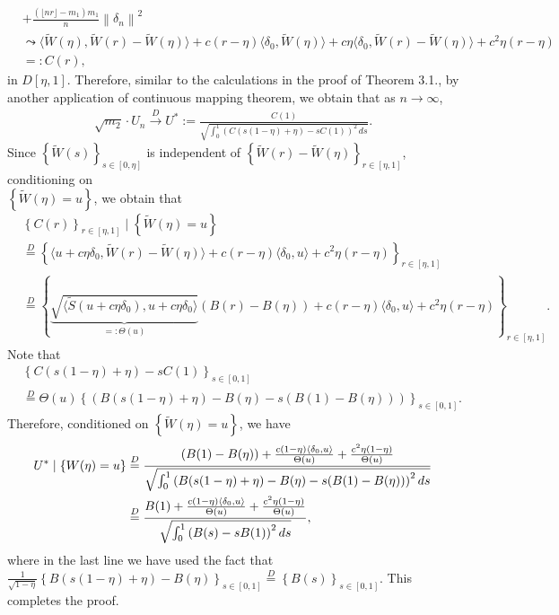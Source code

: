 \documentclass[11pt]{article}
\theoremstyle{plain}
\theoremstyle{definition}
\theoremstyle{remark}
\begin{document}
\begin{appendix}
\begin{enumerate}
\begin{align*}
        &+\frac{(\lfloor nr \rfloor-m_1) m_1}{n}\left\|\delta_n\right\|^2\\
        &\leadsto \langle \tilde{W}(\eta), \tilde{W}(r)-\tilde{W}(\eta)\rangle+ c(r-\eta)\langle \delta_0 , \tilde{W}(\eta)\rangle + c \eta \langle \delta_0, \tilde{W}(r)-\tilde{W}(\eta)\rangle +c^2 \eta (r-\eta)\\
        &=:C(r),        
    \end{align*}
    in $D[\eta,1]$. Therefore, similar to the calculations in the proof of Theorem 3.1., by another application of continuous mapping theorem, we obtain that as $n \to \infty$,
    \begin{align*}
        \sqrt{m_2} \cdot U_n\overset{D}{\to} U^*:=\frac{C(1)}{\sqrt{\int_{0}^{1}\left(C(s(1-\eta)+\eta)-sC(1)\right)^2\,ds}}.
    \end{align*}
    Since $\left\{\tilde{W}(s)\right\}_{s \in [0,\eta]}$ is independent of $\left\{\tilde{W}(r)-\tilde{W}(\eta)\right\}_{r \in [\eta, 1]}$, conditioning on\\ $\left\{\tilde{W}(\eta)=u\right\}$, we obtain that
    \begin{align*}
        &\left\{C(r)\right\}_{r \in [\eta,1]}\mid \left\{\tilde{W}(\eta)=u\right\}\\
        &\overset{D}{=} \left\{\langle u+c \eta \delta_0, \tilde{W}(r)-\tilde{W}(\eta)\rangle +c (r-\eta) \langle \delta_0, u \rangle + c^2 \eta (r-\eta)\right\}_{r \in [\eta,1]}\\
        &\overset{D}{=}\left\{\underbrace{\sqrt{\langle \tilde{S}(u+c \eta \delta_0), u+c \eta \delta_0\rangle}}_{=:\Theta(u)}\left(B(r)-B(\eta)\right)+c (r-\eta) \langle \delta_0, u \rangle + c^2 \eta (r-\eta)\right\}_{r \in [\eta,1]} .
    \end{align*}%
     Note that
    \begin{align*}
        &\left\{C(s(1-\eta)+\eta)-sC(1)\right\}_{s \in [0,1]}\\
        &\overset{D}{=}\Theta(u)\left\{\left(B(s(1-\eta)+\eta)-B(\eta)-s(B(1)-B(\eta))\right)\right\}_{s \in [0,1]}.
    \end{align*}
    Therefore, conditioned on $\left\{\tilde{W}(\eta)=u\right\}$, we have
    \begin{align*}
        U^*\mid \left\{W(\eta)=u\right\}&\overset{D}{=} \frac{(B(1)-B(\eta))+\frac{c (1-\eta) \langle \delta_0, u \rangle}{\Theta(u)}+\frac{c^2 \eta (1-\eta)}{\Theta(u)}}{\sqrt{\int_{0}^{1}\left(B(s(1-\eta)+\eta)-B(\eta)-s(B(1)-B(\eta))\right)^2 ds}}\allowdisplaybreaks\\
        &\overset{D}{=}\frac{B(1)+\frac{c (1-\eta) \langle \delta_0, u \rangle}{\Theta(u)}+\frac{c^2 \eta (1-\eta)}{\Theta(u)}}{\sqrt{\int_{0}^{1}\left(B(s)-sB(1)\right)^2 ds}},
    \end{align*}
    where in the last line we have used the fact that\\ $\frac{1}{\sqrt{1-\eta}}\left\{B(s(1-\eta)+\eta)-B(\eta)\right\}_{s \in [0,1]}\overset{D}{=}\left\{B(s)\right\}_{s \in [0,1]}.$ This completes the proof.
    \end{enumerate}

\end{appendix}
\end{document}

